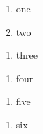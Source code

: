 \documentclass{article}
\newcommand\lab{\roman}
\begin{document}
\begin{enumerate}[label=\textnormal{(\roman{*})}]\item one \item two\end{enumerate}
\begin{enumerate}[label=(\csname roman\endcsname*)]\item three\end{enumerate}
\begin{enumerate}[label=(\lab*)]\item four\end{enumerate}
\begin{enumerate}[label=**]\item five\end{enumerate}
\begin{enumerate}[label=\alph*)]\item six\end{enumerate}
\end{document}
